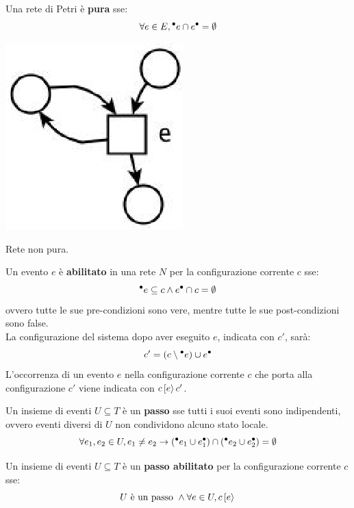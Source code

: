 \begin{defn}
    Una rete di Petri è \textbf{pura} sse:
    \[
        \forall e \in E, {^\bullet}e \cap e^\bullet = \emptyset
    \]
    \begin{marginfigure}[-1cm]
        \includegraphics[width=0.4\linewidth]{img/rete_non_pura.png}
        \caption{Rete non pura.}
        \label{fig:rete_non_pura}
    \end{marginfigure}
\end{defn}

\begin{defn}
    Un evento $e$ è \textbf{abilitato} in una rete $N$ per la configurazione
    corrente $c$ sse:
    \[
        {^\bullet}e \subseteq c \land e^\bullet \cap c = \emptyset
    \]
    ovvero tutte le sue pre-condizioni sono vere, mentre tutte le sue
    post-condizioni sono false.\\
    La configurazione del sistema dopo aver eseguito $e$, indicata con $c'$,
    sarà:
    \[
        c' = \left(c \setminus {^\bullet}e\right) \cup e^\bullet
    \]
    L'occorrenza di un evento $e$ nella configurazione corrente $c$ che porta
    alla configurazione $c'$ viene indicata con $c\,[e\rangle\,c'$.
\end{defn}

\begin{defn}
    Un insieme di eventi $U \subseteq T$ è un \textbf{passo} sse tutti i suoi
    eventi sono indipendenti, ovvero eventi diversi di $U$ non condividono
    alcuno stato locale.
    \[
        \forall e_1, e_2 \in U, e_1 \neq e_2 \rightarrow
        ({^\bullet}e_1 \cup e_1^\bullet) \cap
        ({^\bullet}e_2 \cup e_2^\bullet) = \emptyset
    \]
\end{defn}

\begin{defn}
    Un insieme di eventi $U \subseteq T$ è un \textbf{passo abilitato}
    per la configurazione corrente $c$ sse:
    \[
        U \textnormal{ è un passo } \land \forall e \in U, c\,[e\rangle\,
    \]
\end{defn}

